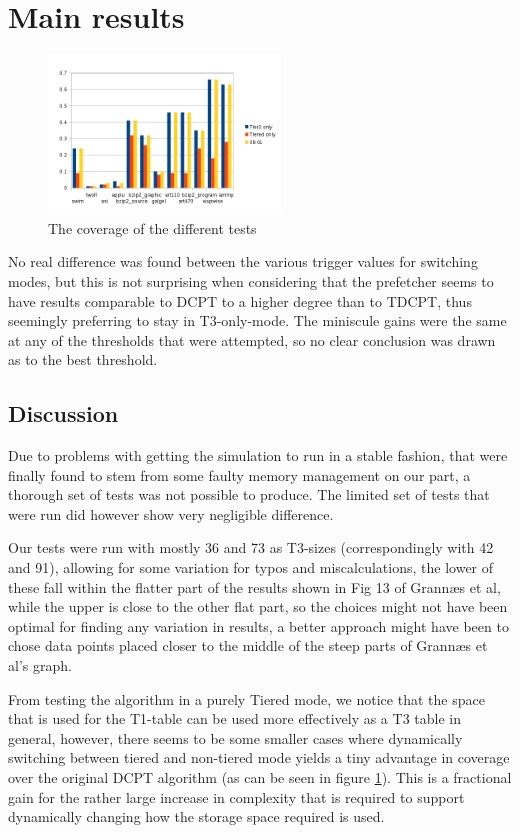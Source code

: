 \section{Main results}
\begin{figure}
\centering
\includegraphics[width=0.55\textwidth]{images/dmarkchart.png}
\caption{The coverage of the different tests}
\label{fig:chart}
\end{figure}
No real difference was found between the various trigger values for switching modes,
but this is not surprising when considering that the prefetcher seems to have results
comparable to DCPT to a higher degree than to TDCPT, thus seemingly preferring to stay
in T3-only-mode. The miniscule gains were the same at any of the thresholds that were
attempted, so no clear conclusion was drawn as to the best threshold.

\subsection{Discussion}
Due to problems with getting the simulation to run in a stable fashion, that
were finally found to stem from some faulty memory management on our part, a
thorough set of tests was not possible to produce. The limited set of tests
that were run did however show very negligible difference.

Our tests were run with mostly 36 and 73 as T3-sizes (correspondingly with 42 and 91),
allowing for some variation for typos and miscalculations, the lower of these fall within the
flatter part of the results shown in Fig 13 of Grannæs et al, while the upper is close to the
other flat part, so the choices might not have been optimal for finding any variation in results,
a better approach might have been to chose data points placed closer to the middle of the steep parts
of Grannæs et al's graph.

From testing the algorithm in a purely Tiered mode, we notice that the
space that is used for the T1-table can be used more effectively as a T3
table in general, however, there seems to be some smaller cases where dynamically
switching between tiered and non-tiered mode yields a tiny advantage in coverage
over the original DCPT algorithm (as can be seen in figure \ref{fig:chart}). 
This is a fractional gain for the rather
large increase in complexity that is required to support dynamically changing how
the storage space required is used.


